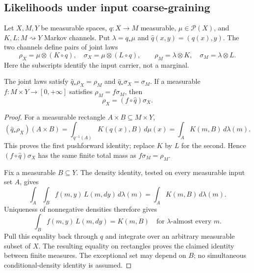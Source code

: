 \subsection{Likelihoods under input coarse-graining}
\label{sec:input-likelihood}

Let $X,M,Y$ be measurable spaces, $q:X\to M$ measurable,
$\mu\in\mathcal P(X)$, and $K,L:M\rightsquigarrow Y$ Markov
channels. Put $\lambda=q_*\mu$ and $\widehat q(x,y)=(q(x),y)$.
The two channels define pairs of joint laws
\[
 \rho_X=\mu\otimes(K\circ q),\quad
 \sigma_X=\mu\otimes(L\circ q),\qquad
 \rho_M=\lambda\otimes K,\quad
 \sigma_M=\lambda\otimes L.
\]
Here the subscripts identify the input carrier, not a marginal.

\begin{lemma}
\label{lem:input-density}
The joint laws satisfy $\widehat q_*\rho_X=\rho_M$ and
$\widehat q_*\sigma_X=\sigma_M$. If a measurable
$f:M\times Y\to[0,+\infty]$ satisfies $\rho_M=f\sigma_M$, then
\[
 \rho_X=(f\circ\widehat q)\sigma_X.
\]
\end{lemma}
\begin{proof}
For a measurable rectangle $A\times B\subseteq M\times Y$,
\[
 (\widehat q_*\rho_X)(A\times B)
 =\int_{q^{-1}(A)}K(q(x),B)\,d\mu(x)
 =\int_A K(m,B)\,d\lambda(m).
\]
This proves the first pushforward identity; replace $K$ by $L$ for
the second. Hence $(f\circ\widehat q)\sigma_X$ has the same finite
total mass as $f\sigma_M=\rho_M$.

Fix a measurable $B\subseteq Y$. The density identity, tested on
every measurable input set $A$, gives
\[
 \int_A\int_B f(m,y)\,L(m,dy)\,d\lambda(m)
 =\int_A K(m,B)\,d\lambda(m).
\]
Uniqueness of nonnegative densities therefore gives
\[
 \int_B f(m,y)\,L(m,dy)=K(m,B)
 \quad\text{for $\lambda$-almost every $m$}.
\]
Pull this equality back through $q$ and integrate over an arbitrary
measurable subset of $X$. The resulting equality on rectangles proves
the claimed identity between finite measures. The exceptional set may
depend on $B$; no simultaneous conditional-density identity is assumed.
\end{proof}

